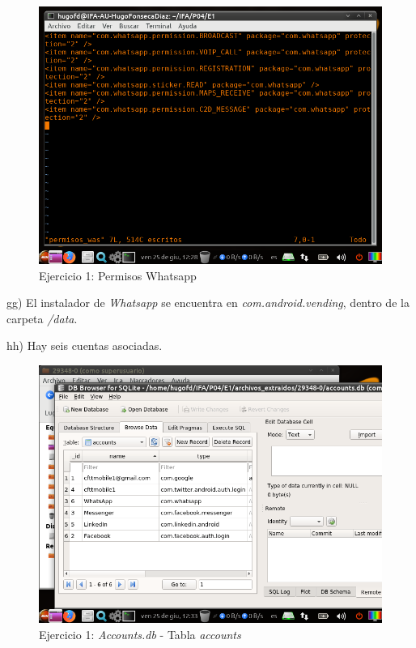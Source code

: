 \documentclass[11pt]{article}
\begin{document}
\begin{figure}[H]
    \caption{Ejercicio 1: Permisos Whatsapp}
    \centering
    \includegraphics[scale=0.7]{e1-31.png}
\end{figure}

gg) El instalador de \textit{Whatsapp} se encuentra en \textit{com.android.vending}, dentro de la carpeta \textit{/data}.

hh) Hay seis cuentas asociadas.

\begin{figure}[H]
    \caption{Ejercicio 1: \textit{Accounts.db} - Tabla \textit{accounts}}
    \centering
    \includegraphics[scale=0.7]{e1-32.png}
\end{figure}
\end{document}
